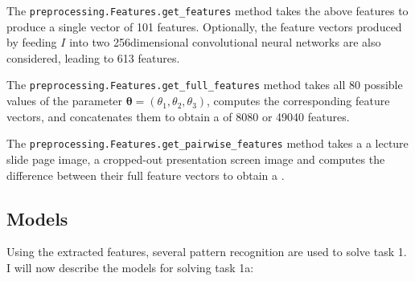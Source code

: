 The \texttt{preprocessing.Features.get\_features} method takes the above
features to produce a single vector of 101 features. Optionally, the 
feature vectors produced by feeding $I$ into two 256dimensional 
convolutional neural networks are also considered, leading to 613 features.

The \texttt{preprocessing.Features.get\_full\_features} method takes all
80 possible values of the parameter
$\bm\theta=(\theta_1,\theta_2,\theta_3)$, computes the corresponding feature
vectors, and concatenates them to obtain a  of 8080 or 49040
features.

The \texttt{preprocessing.Features.get\_pairwise\_features} method takes a
a lecture slide page image, a cropped-out presentation screen image and
computes the difference between their full feature vectors to obtain a
.

\subsection{Models}
Using the extracted features, several pattern recognition  are
used to solve task 1. I will now describe the models for solving task 1a:

